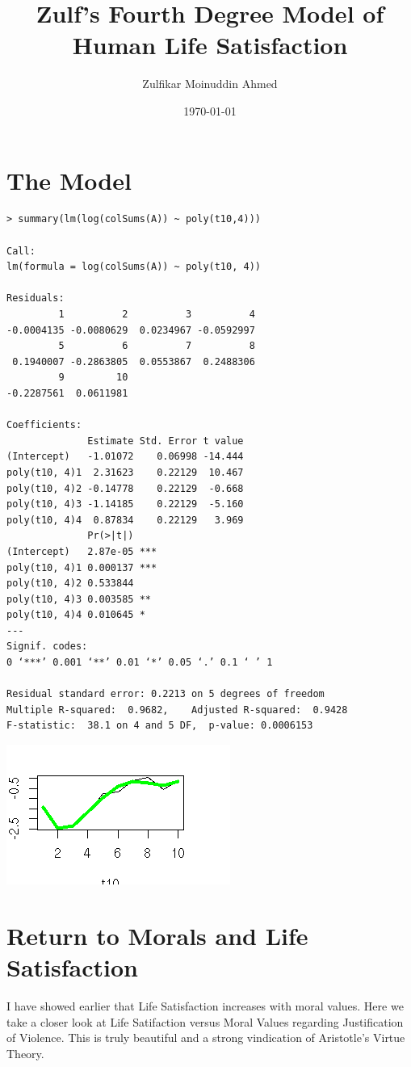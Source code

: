 \documentclass{amsart}
\title{Zulf's Fourth Degree Model of Human Life Satisfaction}
\author{Zulfikar Moinuddin Ahmed}
\date{\today}
\begin{document}
\maketitle


\section{The Model}

\begin{verbatim}
> summary(lm(log(colSums(A)) ~ poly(t10,4)))

Call:
lm(formula = log(colSums(A)) ~ poly(t10, 4))

Residuals:
         1          2          3          4 
-0.0004135 -0.0080629  0.0234967 -0.0592997 
         5          6          7          8 
 0.1940007 -0.2863805  0.0553867  0.2488306 
         9         10 
-0.2287561  0.0611981 

Coefficients:
              Estimate Std. Error t value
(Intercept)   -1.01072    0.06998 -14.444
poly(t10, 4)1  2.31623    0.22129  10.467
poly(t10, 4)2 -0.14778    0.22129  -0.668
poly(t10, 4)3 -1.14185    0.22129  -5.160
poly(t10, 4)4  0.87834    0.22129   3.969
              Pr(>|t|)    
(Intercept)   2.87e-05 ***
poly(t10, 4)1 0.000137 ***
poly(t10, 4)2 0.533844    
poly(t10, 4)3 0.003585 ** 
poly(t10, 4)4 0.010645 *  
---
Signif. codes:  
0 ‘***’ 0.001 ‘**’ 0.01 ‘*’ 0.05 ‘.’ 0.1 ‘ ’ 1

Residual standard error: 0.2213 on 5 degrees of freedom
Multiple R-squared:  0.9682,	Adjusted R-squared:  0.9428 
F-statistic:  38.1 on 4 and 5 DF,  p-value: 0.0006153
\end{verbatim}

\includegraphics[scale=2.0]{lifesat.png}

\section{Return to Morals and Life Satisfaction}

I have showed earlier that Life Satisfaction increases with moral values.  Here we take a closer look at Life Satifaction versus Moral Values regarding Justification of Violence. This is truly beautiful and a strong vindication of Aristotle's Virtue Theory.
\end{document}

